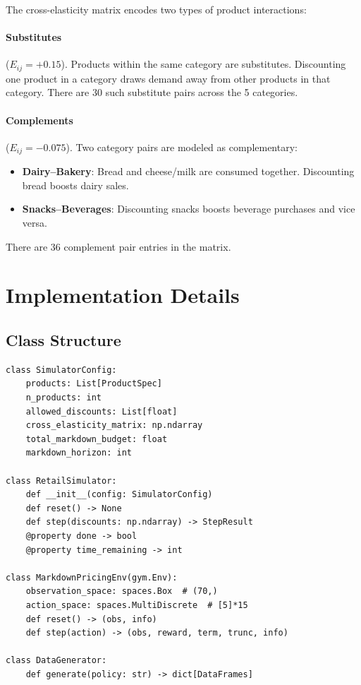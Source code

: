 \documentclass[11pt,a4paper]{article}
\begin{document}
The cross-elasticity matrix encodes two types of product interactions:

\paragraph{Substitutes} ($E_{ij} = +0.15$). Products within the same category are substitutes. Discounting one product in a category draws demand away from other products in that category. There are 30 such substitute pairs across the 5 categories.

\paragraph{Complements} ($E_{ij} = -0.075$). Two category pairs are modeled as complementary:
\begin{itemize}
    \item \textbf{Dairy--Bakery}: Bread and cheese/milk are consumed together. Discounting bread boosts dairy sales.
    \item \textbf{Snacks--Beverages}: Discounting snacks boosts beverage purchases and vice versa.
\end{itemize}
There are 36 complement pair entries in the matrix.

\section{Implementation Details}
\label{sec:impl}

\subsection{Class Structure}

\begin{lstlisting}[caption={Core class interface (simplified).}]
class SimulatorConfig:
    products: List[ProductSpec]
    n_products: int
    allowed_discounts: List[float]
    cross_elasticity_matrix: np.ndarray
    total_markdown_budget: float
    markdown_horizon: int

class RetailSimulator:
    def __init__(config: SimulatorConfig)
    def reset() -> None
    def step(discounts: np.ndarray) -> StepResult
    @property done -> bool
    @property time_remaining -> int

class MarkdownPricingEnv(gym.Env):
    observation_space: spaces.Box  # (70,)
    action_space: spaces.MultiDiscrete  # [5]*15
    def reset() -> (obs, info)
    def step(action) -> (obs, reward, term, trunc, info)

class DataGenerator:
    def generate(policy: str) -> dict[DataFrames]
\end{lstlisting}
\end{document}
